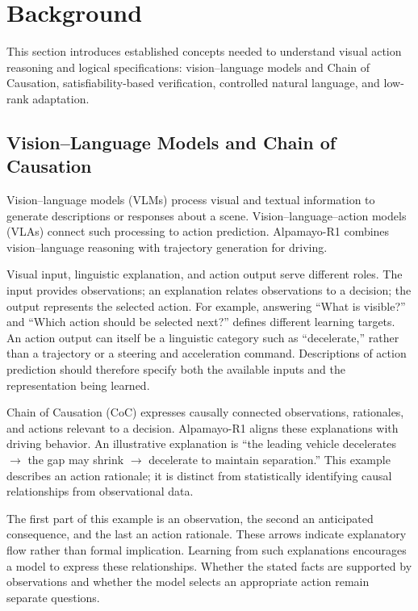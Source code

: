 \documentclass[nolineno]{ieeeaccess}
\begin{document}
\section{Background}

This section introduces established concepts needed to understand visual action reasoning and logical specifications: vision--language models and Chain of Causation, satisfiability-based verification, controlled natural language, and low-rank adaptation.\par

\subsection{Vision--Language Models and Chain of Causation}

Vision--language models (VLMs) process visual and textual information to generate descriptions or responses about a scene. Vision--language--action models (VLAs) connect such processing to action prediction. Alpamayo-R1 combines vision--language reasoning with trajectory generation for driving. \cite{r1}\par

Visual input, linguistic explanation, and action output serve different roles. The input provides observations; an explanation relates observations to a decision; the output represents the selected action. For example, answering “What is visible?” and “Which action should be selected next?” defines different learning targets. An action output can itself be a linguistic category such as “decelerate,” rather than a trajectory or a steering and acceleration command. Descriptions of action prediction should therefore specify both the available inputs and the representation being learned.\par

Chain of Causation (CoC) expresses causally connected observations, rationales, and actions relevant to a decision. Alpamayo-R1 aligns these explanations with driving behavior. \cite{r1} An illustrative explanation is “the leading vehicle decelerates \ensuremath{\rightarrow} the gap may shrink \ensuremath{\rightarrow} decelerate to maintain separation.” This example describes an action rationale; it is distinct from statistically identifying causal relationships from observational data.\par

The first part of this example is an observation, the second an anticipated consequence, and the last an action rationale. These arrows indicate explanatory flow rather than formal implication. Learning from such explanations encourages a model to express these relationships. Whether the stated facts are supported by observations and whether the model selects an appropriate action remain separate questions.\par
\end{document}
